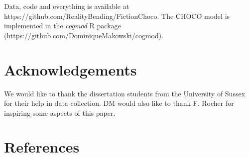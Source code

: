 \documentclass[
  jou,
  floatsintext,
  longtable,
  nolmodern,
  notxfonts,
  notimes,
  colorlinks=true,linkcolor=blue,citecolor=blue,urlcolor=blue]{apa7}
\begin{document}
Data, code and everything is available at
https://github.com/RealityBending/FictionChoco. The CHOCO model is
implemented in the \emph{cogmod} R package
(https://github.com/DominiqueMakowski/cogmod).

\section{Acknowledgements}\label{acknowledgements}

We would like to thank the dissertation students from the University of
Sussex for their help in data collection. DM would also like to thank F.
Rocher for inspiring some aspects of this paper.

\section{References}\label{references}
\end{document}
